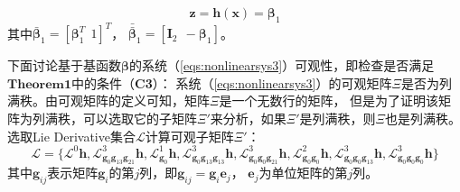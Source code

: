 \documentclass{article}
\begin{document}
\begin{equation}
    \textbf{z}=\textbf{h}(\textbf{x})=\mathbf{\beta}_1
\end{equation}
其中$\bar{\mathbf{\beta}}_{1}=\left[\mathbf{\beta}_{1}^{T}\ \ 1\right]^T$，
$\bar{\bar{\mathbf{\beta}}}_{1}=\left[\textbf{I}_{2}\ \ -\mathbf{\beta}_{1}\right]$。

\par
下面讨论基于基函数$\mathbf{\beta}$的系统（\ref{eqs:nonlinearsys3}）可观性，即检查是否满足$\textbf{Theorem1}$中的条件（\textbf{C3}）：
系统（\ref{eqs:nonlinearsys3}）的可观矩阵$\Xi$是否为列满秩。由可观矩阵的定义可知，矩阵$\Xi$是一个无数行的矩阵，
但是为了证明该矩阵为列满秩，可以选取它的子矩阵$\Xi'$来分析，如果$\Xi'$是列满秩，则$\Xi$也是列满秩。
选取Lie Derivative集合$\mathcal{L}$计算可观子矩阵$\Xi'$：
\begin{equation}
    \mathcal{L}=\{\mathcal{L}^{0}\textbf{h},\mathcal{L}_{\textbf{g}_{0}\textbf{g}_{13}\textbf{g}_{21}}^{3}\textbf{h},
    \mathcal{L}_{\textbf{g}_{0}}^{1}\textbf{h}, \mathcal{L}_{\textbf{g}_{0}\textbf{g}_{13}\textbf{g}_{13}}^{3}\textbf{h},
    \mathcal{L}_{\textbf{g}_{0}\textbf{g}_{0}\textbf{g}_{21}}^{3}\textbf{h},
    \mathcal{L}_{\textbf{g}_{0}\textbf{g}_{0}}^{2}\textbf{h},
    \mathcal{L}_{\textbf{g}_{0}\textbf{g}_{0}\textbf{g}_{13}}^{3}\textbf{h},
    \mathcal{L}_{\textbf{g}_{0}\textbf{g}_{0}\textbf{g}_{0}}^{3}\textbf{h}\}
\end{equation}
其中$\textbf{g}_{ij}$表示矩阵$\textbf{g}_{i}$的第$j$列，即$\textbf{g}_{ij}=\textbf{g}_{i}\textbf{e}_{j}$，
$\textbf{e}_{j}$为单位矩阵的第$j$列。
\end{document}
